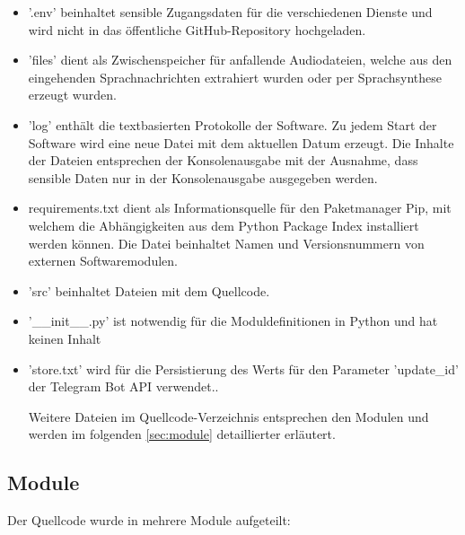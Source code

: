\begin{itemize}
\item '.env' beinhaltet sensible Zugangsdaten für die verschiedenen Dienste und wird nicht in das öffentliche GitHub-Repository hochgeladen. 
\item 'files' dient als Zwischenspeicher für anfallende Audiodateien, welche aus den eingehenden Sprachnachrichten extrahiert wurden oder per Sprachsynthese erzeugt wurden. 
\item 'log' enthält die textbasierten Protokolle der Software. Zu jedem Start der Software wird eine neue Datei mit dem aktuellen Datum erzeugt. Die Inhalte der Dateien entsprechen der Konsolenausgabe mit der Ausnahme, dass sensible Daten nur in der Konsolenausgabe ausgegeben werden. 
\item requirements.txt dient als Informationsquelle für den Paketmanager Pip, mit welchem die Abhängigkeiten aus dem Python Package Index installiert werden können. Die Datei beinhaltet Namen und Versionsnummern von externen Softwaremodulen. 
\item 'src' beinhaltet Dateien mit dem Quellcode. 
\item '\_\_init\_\_.py' ist notwendig für die Moduldefinitionen in Python und hat keinen Inhalt 
\item 'store.txt' wird für die Persistierung des Werts für den Parameter 'update\_id' der Telegram Bot API verwendet.\cite[S. 337]{python}.

Weitere Dateien im Quellcode-Verzeichnis entsprechen den Modulen und werden im folgenden \autoref{sec:module} detaillierter erläutert. 

\end{itemize}

\subsection{Module}
\label{sec:module}

Der Quellcode wurde in mehrere Module aufgeteilt:

